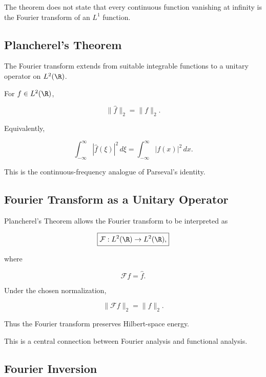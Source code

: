 The theorem does not state that every continuous function vanishing at
infinity is the Fourier transform of an \(L^1\) function.

\subsection{Plancherel's Theorem}
\label{subsec:plancherel-theorem}

The Fourier transform extends from suitable integrable functions to a
unitary operator on \(L^2(\R)\).

\begin{theorem}
For \(f\in L^2(\R)\),

\[
\boxed{
\|\widehat{f}\|_2
=
\|f\|_2.
}
\]
\end{theorem}

Equivalently,

\[
\boxed{
\int_{-\infty}^{\infty}
|\widehat{f}(\xi)|^2\,d\xi
=
\int_{-\infty}^{\infty}
|f(x)|^2\,dx.
}
\]

This is the continuous-frequency analogue of Parseval's identity.

\subsection{Fourier Transform as a Unitary Operator}
\label{subsec:fourier-unitary}

Plancherel's Theorem allows the Fourier transform to be interpreted as

\[
\boxed{
\mathcal{F}:L^2(\R)\to L^2(\R),
}
\]

where

\[
\mathcal{F}f=\widehat{f}.
\]

Under the chosen normalization,

\[
\boxed{
\|\mathcal{F}f\|_2=\|f\|_2.
}
\]

Thus the Fourier transform preserves Hilbert-space energy.

This is a central connection between Fourier analysis and functional
analysis.

\subsection{Fourier Inversion}
\label{subsec:fourier-inversion}

